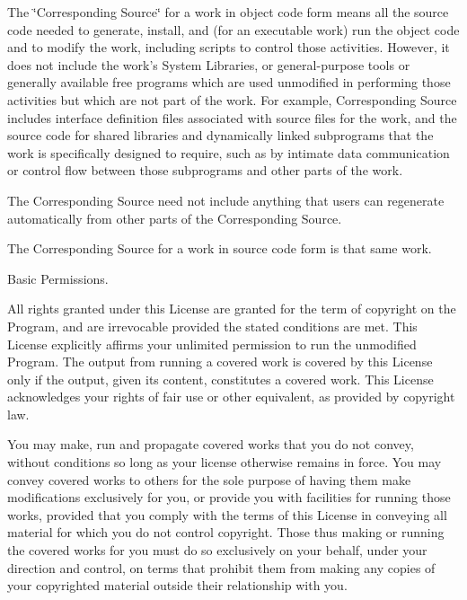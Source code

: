 The \char`\"{}\+Corresponding Source\char`\"{} for a work in object code form means all the source code needed to generate, install, and (for an executable work) run the object code and to modify the work, including scripts to control those activities. However, it does not include the work's System Libraries, or general-\/purpose tools or generally available free programs which are used unmodified in performing those activities but which are not part of the work. For example, Corresponding Source includes interface definition files associated with source files for the work, and the source code for shared libraries and dynamically linked subprograms that the work is specifically designed to require, such as by intimate data communication or control flow between those subprograms and other parts of the work.

The Corresponding Source need not include anything that users can regenerate automatically from other parts of the Corresponding Source.

The Corresponding Source for a work in source code form is that same work.


\begin{DoxyEnumerate}
\item Basic Permissions.
\end{DoxyEnumerate}

All rights granted under this License are granted for the term of copyright on the Program, and are irrevocable provided the stated conditions are met. This License explicitly affirms your unlimited permission to run the unmodified Program. The output from running a covered work is covered by this License only if the output, given its content, constitutes a covered work. This License acknowledges your rights of fair use or other equivalent, as provided by copyright law.

You may make, run and propagate covered works that you do not convey, without conditions so long as your license otherwise remains in force. You may convey covered works to others for the sole purpose of having them make modifications exclusively for you, or provide you with facilities for running those works, provided that you comply with the terms of this License in conveying all material for which you do not control copyright. Those thus making or running the covered works for you must do so exclusively on your behalf, under your direction and control, on terms that prohibit them from making any copies of your copyrighted material outside their relationship with you.

